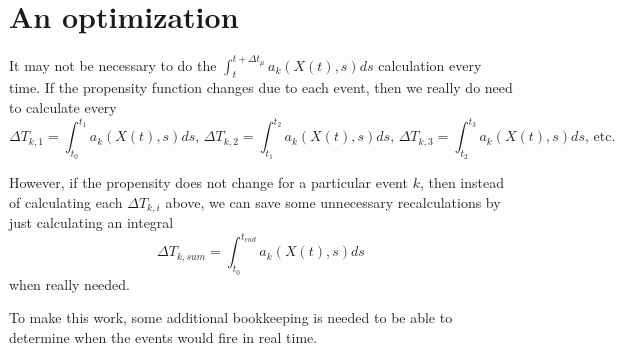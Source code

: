 \documentclass[a4paper,11pt]{article}
\begin{document}
	\section*{An optimization}

		It may not be necessary to do the $\int_t^{t+\Delta t_\mu} a_k(X(t),s) ds$ calculation every time.
		If the propensity function changes due to each event, then we really do need to calculate every
		\[ \Delta T_{k,1} = \int_{t_0}^{t_1} a_k(X(t),s) ds \textrm{, }
		   \Delta T_{k,2} = \int_{t_1}^{t_2} a_k(X(t),s) ds \textrm{, }
		   \Delta T_{k,3} = \int_{t_2}^{t_3} a_k(X(t),s) ds \textrm{, etc.} \]
		
		However, if the propensity does not change for a particular event $k$, then instead of calculating
		each $\Delta T_{k,i}$ above, we can save some unnecessary recalculations by just calculating an
		integral 
		\[ \Delta T_{k,sum} = \int_{t_0}^{t_{end}} a_k(X(t),s) ds \]
		when really needed.

		To make this work, some additional bookkeeping is needed to be able to determine when the events
		would fire in real time.
\end{document}

